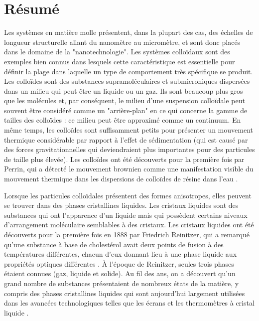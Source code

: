 

\chapter{Résumé}

Les systèmes en matière molle présentent, dans la plupart des cas, des échelles de longueur structurelle allant du nanomètre au micromètre, et sont donc placés dans le domaine de la "nanotechnologie". Les systèmes colloïdaux sont des exemples bien connus dans lesquels cette caractéristique est essentielle pour définir la plage dans laquelle un type de comportement très spécifique se produit. Les colloïdes sont des substances supramoléculaires et submicroniques dispersées dans un milieu qui peut être un liquide ou un gaz. Ils sont beaucoup plus gros que les molécules et, par conséquent, le milieu d'une suspension colloïdale peut souvent être considéré comme un "arrière-plan" en ce qui concerne la gamme de tailles des colloïdes : ce milieu peut être approximé comme un continuum. En même temps, les colloïdes sont suffisamment petits pour présenter un mouvement thermique considérable par rapport à l'effet de sédimentation (qui est causé par des forces gravitationnelles qui deviendraient plus importantes pour des particules de taille plus élevée). Les colloïdes ont été découverts pour la première fois par Perrin, qui a détecté le mouvement brownien comme une manifestation visible du mouvement thermique dans les dispersions de colloïdes de résine dans l'eau \cite{perrin1913atomes}.

Lorsque les particules colloïdales présentent des formes anisotropes, elles peuvent se trouver dans des phases cristallines liquides. Les cristaux liquides sont des substances qui ont l'apparence d'un liquide mais qui possèdent certains niveaux d'arrangement moléculaire semblables à des cristaux. Les cristaux liquides ont été découverts pour la première fois en 1888 par Friedrich Reinitzer, qui a remarqué qu'une substance à base de cholestérol avait deux points de fusion à des températures différentes, chacun d'eux donnant lieu à une phase liquide aux propriétés optiques différentes \cite{reinitzer1888beitrage}. À l'époque de Reinitzer, seules trois phases étaient connues (gaz, liquide et solide). Au fil des ans, on a découvert qu'un grand nombre de substances présentaient de nombreux états de la matière, y compris des phases cristallines liquides qui sont aujourd'hui largement utilisées dans les avancées technologiques telles que les écrans et les thermomètres à cristal liquide \cite{Li_2012}.

